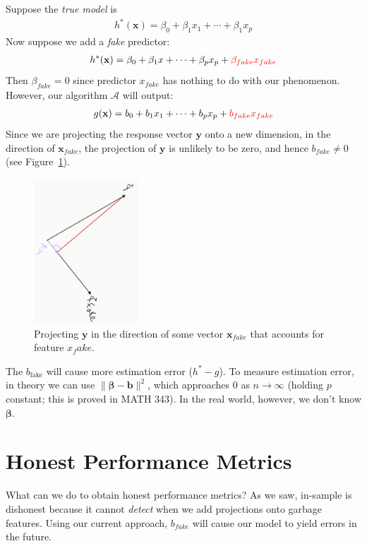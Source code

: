 \documentclass[12pt, a4paper]{article}
\theoremstyle{definition}
\begin{document}
	Suppose the \textit{true model} is
	\begin{align*}
		h^*(\mathbf{x}) = \beta_0 + \beta_1 x_1 + \cdots + \beta_1 x_p
	\end{align*}
	Now suppose we add a \textit{fake} predictor:
	\begin{align*}
		h^*(\mathbf{x})
		= \beta_0 + \beta_1 x + \cdots + \beta_p x_p + {\color{red} \beta_{fake} x_{fake}}
	\end{align*}
	Then $\beta_{fake}=0$ since predictor $x_{fake}$ has nothing to do with
	our phenomenon. However, our algorithm $\mathcal{A}$ will output:
	\begin{align*}
		g(\mathbf{x}) = b_0 + b_1 x_1 + \cdots + b_p x_p + {\color{red}  b_{fake} x_{fake}}
	\end{align*}
	Since we are projecting the response vector $\mathbf{y}$ onto a new dimension,
	in the direction of $\mathbf{x}_{fake}$, the projection of $\mathbf{y}$ is unlikely to
	be zero, and hence $b_{fake}\neq 0$ (see Figure~\ref{fig:project-xfake}).
	\begin{figure}
		\centering
		\includegraphics[width=0.35\textwidth]{project-onto-fake-feature}
		\caption{Projecting $\mathbf{y}$ in the direction of some vector $\mathbf{x}_{fake}$
		that accounts for feature $x_fake$.}
		\label{fig:project-xfake}
	\end{figure}
	The $b_{\text{fake}}$ will cause more estimation error ($h^*-g$). To measure estimation error,
	in theory we can use $\|\bm{\beta}-\mathbf{b}\|^2$, which approaches $0$ as
	$n\to\infty$ (holding $p$ constant; this is proved in MATH 343). In the real
	world, however, we don't know $\bm{\beta}$.
	\section*{Honest Performance Metrics}
	What can we do to obtain honest performance metrics? As we saw, in-sample is dishonest
	because it cannot \textit{detect} when we add projections onto garbage features.
	Using our current approach, $b_{fake}$ will cause our model to yield errors in the future.
	
\end{document}
